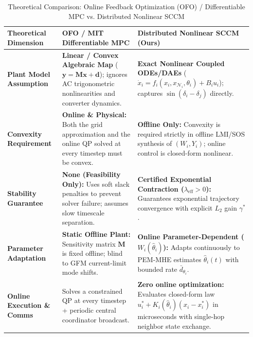\documentclass[journal]{IEEEtran}
\begin{document}
\begin{table}[!t]
\centering
\caption{Theoretical Comparison: Online Feedback Optimization (OFO) / Differentiable MPC vs. Distributed Nonlinear SCCM}
\label{tab:ofo_vs_sccm}
\footnotesize
\renewcommand{\arraystretch}{1.18}
\begin{tabularx}{\textwidth}{>{\raggedright\arraybackslash}p{3.0cm} >{\raggedright\arraybackslash}X >{\raggedright\arraybackslash}X}
\toprule
\textbf{Theoretical Dimension} & \textbf{OFO / MIT Differentiable MPC \cite{chen26}} & \textbf{Distributed Nonlinear SCCM (Ours)} \\
\midrule
\textbf{Plant Model Assumption} & \textbf{Linear / Convex Algebraic Map} ($\mathbf{y} = \mathbf{M}\mathbf{x} + \mathbf{d}$); ignores AC trigonometric nonlinearities and converter dynamics. & \textbf{Exact Nonlinear Coupled ODEs/DAEs} ($\dot{x}_i = f_i(x_i, x_{\mathcal{N}_i}, \theta_i) + B_i u_i$); captures $\sin(\delta_i - \delta_j)$ directly. \\
\addlinespace[2pt]
\textbf{Convexity Requirement} & \textbf{Online \& Physical:} Both the grid approximation and the online QP solved at every timestep must be convex. & \textbf{Offline Only:} Convexity is required strictly in offline LMI/SOS synthesis of $(W_i, Y_i)$; online control is closed-form nonlinear. \\
\addlinespace[2pt]
\textbf{Stability Guarantee} & \textbf{None (Feasibility Only):} Uses soft slack penalties to prevent solver failure; assumes slow timescale separation. & \textbf{Certified Exponential Contraction ($\lambda_{\text{eff}} > 0$):} Guarantees exponential trajectory convergence with explicit $L_2$ gain $\gamma^*$. \\
\addlinespace[2pt]
\textbf{Parameter Adaptation} & \textbf{Static Offline Plant:} Sensitivity matrix $\mathbf{M}$ is fixed offline; blind to GFM current-limit mode shifts. & \textbf{Online Parameter-Dependent ($W_i(\hat{\theta}_i)$):} Adapts continuously to PEM-MHE estimates $\hat{\theta}_i(t)$ with bounded rate $\bar{d}_{\theta_i}$. \\
\addlinespace[2pt]
\textbf{Online Execution \& Comms} & Solves a constrained QP at every timestep + periodic central coordinator broadcast. & \textbf{Zero online optimization:} Evaluates closed-form law $u_i^* + K_i(\hat{\theta}_i)(x_i - x_i^*)$ in microseconds with single-hop neighbor state exchange. \\
\bottomrule
\end{tabularx}
\end{table}
\end{document}
